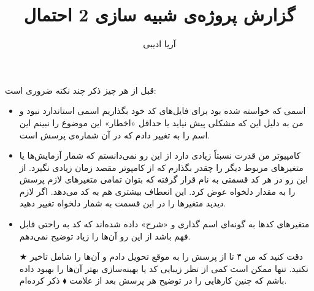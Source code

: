 \documentclass[10pt]{article}
\title{گزارش پروژه‌ی شبیه سازی 2 احتمال}
\author{آریا ادیبی}
\date{}
\theoremstyle{definition}
\theoremstyle{lemma}
\theoremstyle{theorem}
\theoremstyle{remark}
\begin{document}
	\maketitle
	
	 قبل از هر چیز ذکر چند نکته ضروری است:
	 \begin{itemize}
	 	\item
	 	اسمی که خواسته شده بود برای فایل‌های کد خود بگذاریم اسمی استاندارد نبود و من به دلیل
	 	این که مشکلی پیش نیاید یا حداقل «اخطار» این موضوع را نبینم این اسم را به
	 	تغییر دادم که در آن
	 	شماره‌ی پرسش است.
	 	\item
	 	کامپیوتر من قدرت نسبتاً زیادی دارد از این رو نمی‌دانستم که شمار آزمایش‌ها یا متغیر‌های 
	 	مربوط دیگر را چقدر بگذارم که از کامپوتر مقصد زمان زیادی نگیرد. از این رو در هر کد 
	 	قسمتی به نام
	 	قرار گرفته که بتوان تمامی متغیر‌های لازم پرسش را به مقدار دلخواه عوض کرد. این انعطاف
	 	بیشتری هم به کد می‌دهد. اگر لازم دیدید متغیر‌ها را در این قسمت به شمار دلخواه تغییر دهید.
	 	\item
	 	متغیر‌های کد‌ها به گونه‌ای اسم گذاری و «شرح» داده شده‌اند که کد به راحتی قابل فهم باشد
	 	از این رو آن‌ها را زیاد توضیح نمی‌دهم.
	 	\item [\large $\bigstar$]
	 	دقت کنید که من ۴ تا از پرسش را به موقع تحویل دادم و آن‌ها را شامل تاخیر نکنید. تنها ممکن
	 	است کمی از نظر زیبایی کد یا بهینه‌سازی بهتر آن‌ها را بهبود داده باشم که چنین کار‌هایی
	 	را در توضیح هر پرسش بعد از علامت
	 	$\blacklozenge$
	 	ذکر کرده‌ام.
	 \end{itemize}
 	
\end{document}
